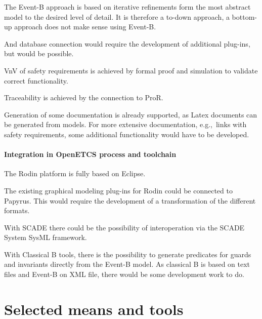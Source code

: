  The Event-B approach is based on iterative refinements form the most abstract
  model to the desired level of detail. It is therefore a to-down approach, a
  bottom-up approach does not make sense using Event-B.

  And database connection would require the development of additional plug-ins,
  but would be possible.

  VnV of safety requirements is achieved by formal proof and simulation to
  validate correct functionality.

  Traceability is achieved by the connection to ProR.

  Generation of some documentation is already supported, as Latex documents can
  be generated from models. For more extensive documentation, e.g.,\ links with
  safety requirements, some additional functionality would have to be developed.
\

\paragraph{Integration in OpenETCS process and toolchain}

  The Rodin platform is fully based on Eclipse.

  The existing graphical modeling plug-ins for Rodin could be connected to
  Papyrus. This would require the development of a transformation of the
  different formats.

  With SCADE there could be the possibility of interoperation via the SCADE
  System SysML framework.

  With Classical B tools, there is the possibility to generate predicates for
  guards and invariants directly from the Event-B model. As classical B is based
  on text files and Event-B on XML file, there would be some development work to
  do.



\section{Selected means and tools}

\begin{comment}
To complete after decision meeting with a section for each tool with the following contents:

\begin{itemize}
\item description of the means or tools, references and links
\item added value for openETCS
\item for which tasks and how (input/output/actions) is the mean or tools used.
\end{itemize}
\end{comment}